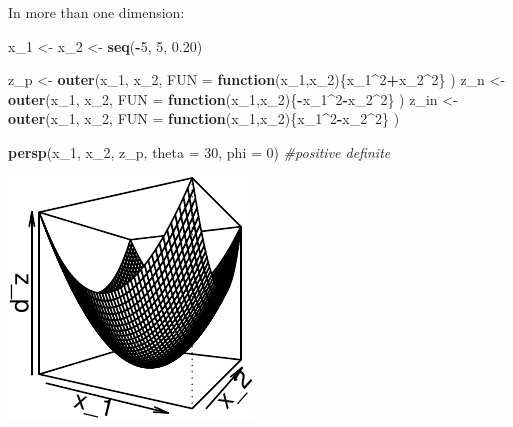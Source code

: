 \documentclass[11pt,]{article}
\newenvironment{Shaded}{\begin{snugshade}}{\end{snugshade}}
\newcommand{\KeywordTok}[1]{\textcolor[rgb]{0.13,0.29,0.53}{\textbf{#1}}}
\newcommand{\DataTypeTok}[1]{\textcolor[rgb]{0.13,0.29,0.53}{#1}}
\newcommand{\DecValTok}[1]{\textcolor[rgb]{0.00,0.00,0.81}{#1}}
\newcommand{\FloatTok}[1]{\textcolor[rgb]{0.00,0.00,0.81}{#1}}
\newcommand{\StringTok}[1]{\textcolor[rgb]{0.31,0.60,0.02}{#1}}
\newcommand{\CommentTok}[1]{\textcolor[rgb]{0.56,0.35,0.01}{\textit{#1}}}
\newcommand{\ControlFlowTok}[1]{\textcolor[rgb]{0.13,0.29,0.53}{\textbf{#1}}}
\newcommand{\OperatorTok}[1]{\textcolor[rgb]{0.81,0.36,0.00}{\textbf{#1}}}
\newcommand{\NormalTok}[1]{#1}
\begin{document}
In more than one dimension:

\begin{Shaded}
\begin{Highlighting}[]
\NormalTok{x_}\DecValTok{1}\NormalTok{ <-}\StringTok{ }\NormalTok{x_}\DecValTok{2}\NormalTok{ <-}\StringTok{ }\KeywordTok{seq}\NormalTok{(}\OperatorTok{-}\DecValTok{5}\NormalTok{, }\DecValTok{5}\NormalTok{, }\FloatTok{0.20}\NormalTok{)}

\NormalTok{z_p <-}\StringTok{ }\KeywordTok{outer}\NormalTok{(x_}\DecValTok{1}\NormalTok{, x_}\DecValTok{2}\NormalTok{, }
            \DataTypeTok{FUN =} \ControlFlowTok{function}\NormalTok{(x_}\DecValTok{1}\NormalTok{,x_}\DecValTok{2}\NormalTok{)\{x_}\DecValTok{1}\OperatorTok{^}\DecValTok{2}\OperatorTok{+}\NormalTok{x_}\DecValTok{2}\OperatorTok{^}\DecValTok{2}\NormalTok{\}}
\NormalTok{            ) }
\NormalTok{z_n <-}\StringTok{ }\KeywordTok{outer}\NormalTok{(x_}\DecValTok{1}\NormalTok{, x_}\DecValTok{2}\NormalTok{,}
            \DataTypeTok{FUN =} \ControlFlowTok{function}\NormalTok{(x_}\DecValTok{1}\NormalTok{,x_}\DecValTok{2}\NormalTok{)\{}\OperatorTok{-}\NormalTok{x_}\DecValTok{1}\OperatorTok{^}\DecValTok{2}\OperatorTok{-}\NormalTok{x_}\DecValTok{2}\OperatorTok{^}\DecValTok{2}\NormalTok{\}}
\NormalTok{            ) }
\NormalTok{z_in <-}\StringTok{ }\KeywordTok{outer}\NormalTok{(x_}\DecValTok{1}\NormalTok{, x_}\DecValTok{2}\NormalTok{,}
             \DataTypeTok{FUN =} \ControlFlowTok{function}\NormalTok{(x_}\DecValTok{1}\NormalTok{,x_}\DecValTok{2}\NormalTok{)\{x_}\DecValTok{1}\OperatorTok{^}\DecValTok{2}\OperatorTok{-}\NormalTok{x_}\DecValTok{2}\OperatorTok{^}\DecValTok{2}\NormalTok{\}}
\NormalTok{              ) }

\KeywordTok{persp}\NormalTok{(x_}\DecValTok{1}\NormalTok{, x_}\DecValTok{2}\NormalTok{, z_p, }\DataTypeTok{theta =} \DecValTok{30}\NormalTok{, }\DataTypeTok{phi =} \DecValTok{0}\NormalTok{) }\CommentTok{#positive definite}
\end{Highlighting}
\end{Shaded}

\begin{center}\includegraphics{Optimization_files/figure-latex/FOC_dim_2-1} \end{center}
\end{document}
